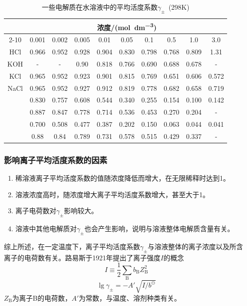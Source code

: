\documentclass[dvipsnames, svgnames, x11names]{beamer}
\begin{document}
	
	\begin{frame}
		\frametitle{}
	
	\begin{table}[]
		\caption{一些电解质在水溶液中的平均活度系数$\gamma_\pm$\ (298K)}
		\label{tab:my-table}
		\begin{tabular}{cccccccccc}
		\hline
		\rowcolor{maincolor!10} 
		\cellcolor{maincolor!10}                   & \multicolumn{9}{c}{\cellcolor{maincolor!10}浓度/(\si{mol.dm^{-3}})} \\ \cline{2-10} 
		\rowcolor{maincolor!10} 
		\multirow{-2}{*}{\cellcolor{maincolor!10}电解质} &   0.001  &  0.002   &  0.005  &  0.01  &  0.05  &  0.1  &  0.5  &  1.0  &  3.0  \\ \hline
			HCl   &  0.966   &   0.952  &  0.928  &  0.904  &  0.830  &  0.798  &  0.768  &  0.809  &  1.31  \\
			KOH   &  -   &   -  &  0.90  &  0.818  &  0.766  &  0.690  &  0.688  &  0.678  &  -  \\
			KCl   &  0.965   &  0.952   &  0.923  &  0.901  &  0.815  &  0.769  &  0.651  &  0.606  &  0.572  \\
			NaCl   &   0.965  &   0.952  &  0.927  &  0.912  &  0.819  &  0.778  &  0.682  &  0.658  &   0.719 \\
			\ch{H2SO4}   &   0.830  &   0.757  &  0.608  &  0.544  &  0.340  &  0.255  &  0.154  &  0.100  &  0.142  \\
			\ch{Na2SO4}   &   0.887  &   0.847  &  0.778  &  0.714  &  0.536  &  0.453  &  0.270  &  0.204  &  -  \\
			\ch{ZnSO4}    &   0.700  &   0.508  &  0.477  &  0.387  &  0.202  &  0.150  &  0.063  &  0.044  &  0.041  \\
			\ch{ZnCl2}    &   0.88  &   0.84  &  0.789  &  0.731  &  0.578  &  0.515  &  0.429  &  0.337  &  -  \\ \hline
		\end{tabular}
		\end{table}
	
	\end{frame}
	
	
	
	\begin{frame}
		\frametitle{影响离子平均活度系数的因素}
	
		\begin{enumerate}
			\item 稀溶液离子平均活度系数的值随浓度降低而增大，在无限稀释时达到1。
			\item 溶液浓度高时，随浓度增大离子平均活度系数增大，甚至大于1。
			\item 离子电荷数对$\gamma_{\pm}$影响较大。
			\item 溶液中其他电解质对$\gamma_{\pm}$也会产生影响，说明与溶液整体电解质含量有关。
		\end{enumerate}
		综上所述，在一定温度下，离子平均活度系数$\gamma_{\pm}$与溶液整体的离子浓度以及所含离子的电荷数有关。路易斯于1921年提出了离子强度$I$的概念
		\[
			I \equiv \frac{1}{2}\sum_\mathrm{B}{b_\mathrm{B}Z_\mathrm{B}^2}
		\]
		\[
			\lg \gamma_{\pm} = -A'\sqrt{I/b^\ominus}
		\]
		$Z_\mathrm{B}$为离子B的电荷数，$A'$为常数，与温度、溶剂种类有关。
	
	\end{frame}
	
	
\end{document}
